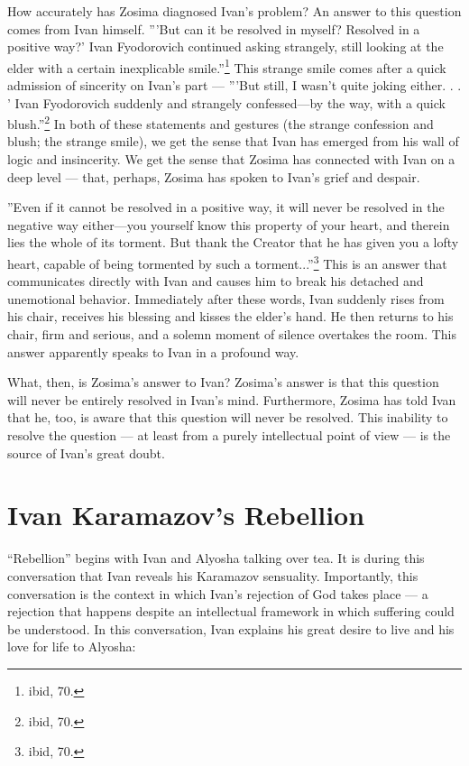	How accurately has Zosima diagnosed Ivan's problem? An answer to this question comes from Ivan himself. '''But can it be resolved in myself? Resolved in a positive way?' Ivan Fyodorovich continued asking strangely, still looking at the elder with a certain inexplicable smile.''\footnote{ibid, 70.} This strange smile comes after a quick admission of sincerity on Ivan's part --- '''But still, I wasn't quite joking either. . . ' Ivan Fyodorovich suddenly and strangely confessed---by the way, with a quick blush.''\footnote{ibid, 70.} In both of these statements and gestures (the strange confession and blush; the strange smile), we get the sense that Ivan has emerged from his wall of logic and insincerity. We get the sense that Zosima has connected with Ivan on a deep level --- that, perhaps, Zosima has spoken to Ivan's grief and despair.

	''Even if it cannot be resolved in a positive way, it will never be resolved in the negative way either---you yourself know this property of your heart, and therein lies the whole of its torment. But thank the Creator that he has given you a lofty heart, capable of being tormented by such a torment...''\footnote{ibid, 70.} This is an answer that communicates directly with Ivan and causes him to break his detached and unemotional behavior. Immediately after these words, Ivan suddenly rises from his chair, receives his blessing and kisses the elder's hand. He then returns to his chair, firm and serious, and a solemn moment of silence overtakes the room. This answer apparently speaks to Ivan in a profound way.

	What, then, is Zosima's answer to Ivan? Zosima's answer is that this question will never be entirely resolved in Ivan's mind. Furthermore, Zosima has told Ivan that he, too, is aware that this question will never be resolved. This inability to resolve the question --- at least from a purely intellectual point of view --- is the source of Ivan's great doubt. 
	
	\section{Ivan Karamazov's Rebellion}
	``Rebellion'' begins with Ivan and Alyosha talking over tea. It is during this conversation that Ivan reveals his Karamazov sensuality. Importantly, this conversation is the context in which Ivan's rejection of God takes place --- a rejection that happens despite an intellectual framework in which suffering could be understood. In this conversation, Ivan explains his great desire to live and his love for life to Alyosha: 
	
